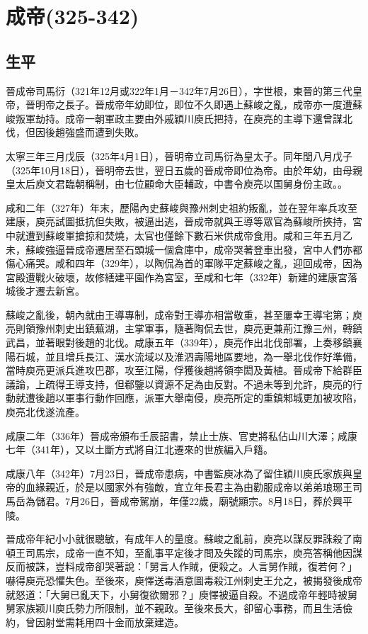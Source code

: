 
\section{成帝\tiny(325-342)}

\subsection{生平}

晉成帝司馬衍（321年12月或322年1月－342年7月26日），字世根，東晉的第三代皇帝，晉明帝之長子。晉成帝年幼即位，即位不久即遇上蘇峻之亂，成帝亦一度遭蘇峻叛軍劫持。成帝一朝軍政主要由外戚穎川庾氏把持，在庾亮的主導下還曾謀北伐，但因後趙強盛而遭到失敗。

太寧三年三月戊辰（325年4月1日），晉明帝立司馬衍為皇太子。同年閏八月戊子（325年10月18日），晉明帝去世，翌日五歲的晉成帝即位為帝。由於年幼，由母親皇太后庾文君臨朝稱制，由七位顧命大臣輔政，中書令庾亮以国舅身份主政。。

咸和二年（327年）年末，歷陽內史蘇峻與豫州刺史祖約叛亂，並在翌年率兵攻至建康，庾亮試圖抵抗但失敗，被逼出逃，晉成帝就與王導等眾官為蘇峻所挾持，宮中就遭到蘇峻軍搶掠和焚燒，太官也僅餘下數石米供成帝食用。咸和三年五月乙未，蘇峻強逼晉成帝遷居至石頭城一個倉庫中，成帝哭著登車出發，宮中人們亦都傷心痛哭。咸和四年（329年），以陶侃為首的軍隊平定蘇峻之亂，迎回成帝，因為宮殿遭戰火破壞，故修繕建平園作為宮室，至咸和七年（332年）新建的建康宮落城後才遷去新宮。

蘇峻之亂後，朝內就由王導專制，成帝對王導亦相當敬重，甚至屢幸王導宅第；庾亮則領豫州刺史出鎮蕪湖，主掌軍事，隨著陶侃去世，庾亮更兼荊江豫三州，轉鎮武昌，並著眼對後趙的北伐。咸康五年（339年），庾亮作出北伐部署，上奏移鎮襄陽石城，並且增兵長江、漢水流域以及淮泗壽陽地區要地，為一舉北伐作好準備，當時庾亮更派兵進攻巴郡，攻至江陽，俘獲後趙將領李閎及黃植。晉成帝下給群臣議論，上疏得王導支持，但郗鑒以資源不足為由反對。不過未等到允許，庾亮的行動就遭後趙以軍事行動作回應，派軍大舉南侵，庾亮所定的重鎮邾城更加被攻陷，庾亮北伐遂流產。

咸康二年（336年）晉成帝頒布壬辰詔書，禁止士族、官吏將私佔山川大澤；咸康七年（341年），又以土斷方式將自江北遷來的世族編入戶籍。

咸康八年（342年）7月23日，晉成帝患病，中書監庾冰為了留住穎川庾氏家族與皇帝的血緣親近，於是以國家外有強敵，宜立年長君主為由勸服成帝以弟弟琅琊王司馬岳為儲君。7月26日，晉成帝駕崩，年僅22歲，廟號顯宗。8月18日，葬於興平陵。

晉成帝年紀小小就很聰敏，有成年人的量度。蘇峻之亂前，庾亮以謀反罪誅殺了南頓王司馬宗，成帝一直不知，至亂事平定後才問及失蹤的司馬宗，庾亮答稱他因謀反而被誅，豈料成帝卻哭著說：「舅言人作賊，便殺之。人言舅作賊，復若何？」嚇得庾亮恐懼失色。至後來，庾懌送毒酒意圖毒殺江州刺史王允之，被揭發後成帝就怒道：「大舅已亂天下，小舅復欲爾邪？」庾懌被逼自殺。不過成帝年輕時被舅舅家族颖川庾氏勢力所限制，並不親政。至後來長大，卻留心事務，而且生活儉約，曾因射堂需耗用四十金而放棄建造。

